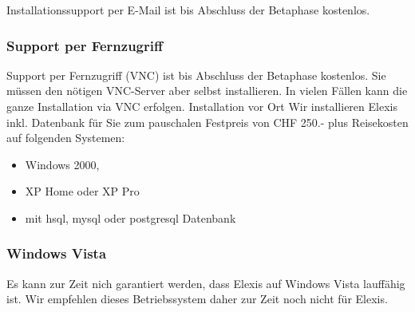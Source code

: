 Installationssupport per E-Mail ist bis Abschluss der Betaphase kostenlos.
\subsubsection{Support per Fernzugriff}

 Support per Fernzugriff (VNC) ist bis Abschluss der Betaphase kostenlos. Sie müssen den nötigen VNC-Server aber selbst installieren. In vielen Fällen kann die ganze Installation via VNC erfolgen.
Installation vor Ort
Wir installieren Elexis inkl. Datenbank für Sie zum pauschalen Festpreis von CHF 250.- plus Reisekosten auf folgenden Systemen:
\begin{itemize}
 \item Windows 2000,
\item XP Home oder XP Pro
\item mit hsql, mysql oder postgresql Datenbank
\end{itemize}

\subsubsection{Windows Vista}
Es kann zur Zeit nich garantiert werden, dass Elexis auf Windows Vista lauffähig ist. Wir empfehlen dieses Betriebssystem daher zur Zeit noch nicht für Elexis.

